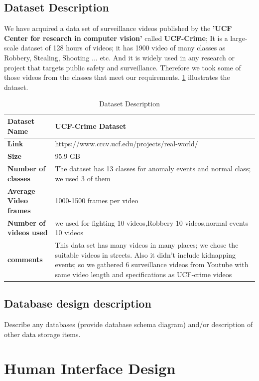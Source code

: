 \documentclass[12pt]{article}
\begin{document}
\subsection{Dataset Description}
We have acquired a data set of surveillance videos published by the \textbf{ 'UCF Center for research in computer vision'} called  \textbf{ UCF-Crime}; It is a large-scale dataset of 128 hours of videos; it has 1900 video of many classes as Robbery, Stealing, Shooting ... etc. And it is widely used in any research or project that targets public safety and surveillance. Therefore we took some of those videos from the classes that meet our requirements. \ref{tab:ds} illustrates the dataset.

\FloatBarrier
\begin{table}[htbp]
\centering
\label{tab:ds}
\caption{Dataset Description}
\begin{tabular}{ | l | m{11cm}|} 
\hline
\textbf{Dataset Name} & UCF-Crime Dataset   \\ 
\hline
\textbf{Link} &  https://www.crcv.ucf.edu/projects/real-world/ \\ 
\hline
\textbf{Size} & 95.9 GB  \\ 
\hline
\textbf{Number of classes} & The dataset has 13 classes for anomaly events and normal class; we used 3 of them  \\
\hline
\textbf{Average Video frames} & 1000-1500 frames per video \\
\hline
\textbf{Number of videos used} & we used for fighting 10 videos,Robbery 10 videos,normal events 10 videos \\
\hline
\textbf{comments} & This data set has many videos in many places; we chose the suitable videos in streets. Also it didn't include kidnapping events; so we gathered 6 surveillance videos from Youtube with same video length and specifications as UCF-crime videos \\
\hline
\end{tabular}
\end{table}
 \FloatBarrier

\subsection{Database design description}
Describe any databases (provide database schema diagram) and/or description of other data storage items.

\section{Human Interface Design}
\label{hid}
\end{document}
